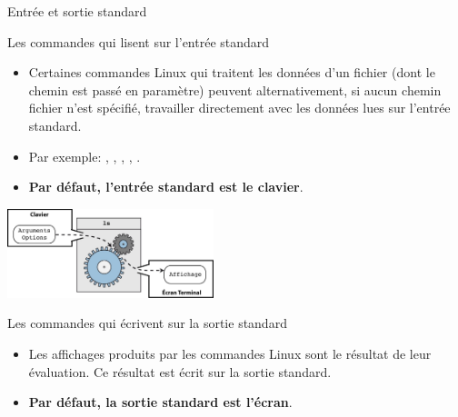\begin{frame}{Entrée et sortie standard}
  \begin{block}{Les commandes qui lisent sur l'entrée standard}
    \begin{itemize}
    \item Certaines commandes Linux qui traitent les données d'un
      fichier (dont le chemin est passé en paramètre) peuvent
      alternativement, si aucun chemin fichier n'est spécifié,
      travailler directement avec les données lues sur l'entrée
      standard.
    \item Par exemple: , , , ,
      .
    \item {\color{red}\textbf{Par défaut, l'entrée standard est le
          clavier}}.
    \end{itemize}
  \end{block}
  \begin{center}
    \includegraphics[width=6cm]{img/s05/stdin_stdout_commande_2.jpg}
  \end{center}
  \begin{block}{Les commandes qui écrivent sur la sortie standard}
    \begin{itemize}
    \item Les affichages produits par les commandes Linux sont le
      résultat de leur évaluation. Ce résultat est écrit sur la sortie
      standard.
    \item {\color{red}\textbf{Par défaut, la sortie standard est
          l'écran}}.
    \end{itemize}
  \end{block}
\end{frame}






